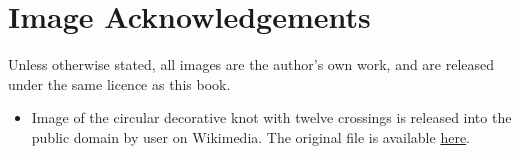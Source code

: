 \chapter{Image Acknowledgements}
Unless otherwise stated, all images are the author's own work, and are released under the same licence as this book.

\begin{itemize}
    \item Image of the circular decorative knot with twelve crossings is released into the public domain by user  on Wikimedia. The original file is available \href{https://commons.wikimedia.org/wiki/File:Circular-cross-decorative-knot-12crossings.svg}{here}.
\end{itemize}
